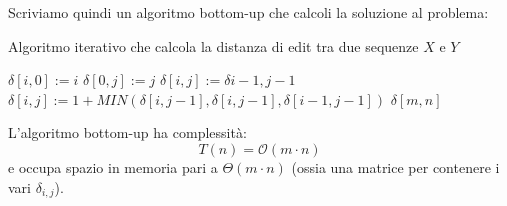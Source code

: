 \documentclass[12pt]{article}
\begin{document}
Scriviamo quindi un algoritmo bottom-up che calcoli la soluzione al problema: \newline
\begin{algorithm}[H]
    \caption{Algoritmo iterativo che calcola la distanza di edit tra due sequenze $X$ e $Y$}
    \DontPrintSemicolon
     {
         {
            $\delta[i,0] := i$
        }
         {
            $\delta[0, j] := j$
        }
         {
             {
                 {
                    $\delta[i,j] := \delta{i-1, j-1}$
                } {
                    $\delta[i,j] := 1 + MIN(\delta[i,j-1], \delta[i, j-1], \delta[i-1,j-1])$
                }
            }
        }
        \Return $\delta[m,n]$
    }
\end{algorithm} \noindent
L'algoritmo bottom-up ha complessità:
$$T(n) = \mathcal{O}(m \cdot n)$$
e occupa spazio in memoria pari a $\Theta(m \cdot n)$ (ossia una matrice per contenere i vari $\delta_{i,j}$).
\end{document}

